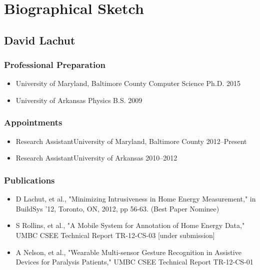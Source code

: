 \section{Biographical Sketch}
  \subsection{David Lachut}
    \subsubsection{Professional Preparation}
      \begin{itemize}
        \item University of Maryland, Baltimore County \hspace{20pt} Computer
	  Science \hfill Ph.D. 2015
	\item University of Arkansas \hspace{116pt} Physics \hfill B.S. 2009
      \end{itemize}
    \subsubsection{Appointments}
      \begin{itemize}
        \item Research Assistant\hfill University of Maryland, Baltimore County
2012--Present
        \item Research Assistant\hfill University of Arkansas \hspace{105pt}
2010--2012
      \end{itemize}

    \subsubsection{Publications}
      \begin{itemize}
	\item D Lachut, et al., "Minimizing Intrusiveness in Home Energy
	  Measurement," in BuildSys '12, Toronto, ON, 2012, pp 56-63. (Best
	  Paper Nominee)
        \item S Rollins, et al., "A Mobile System for Annotation of Home
	  Energy Data," UMBC CSEE Technical Report TR-12-CS-03 [under
	  submission]
        \item A Nelson, et al., "Wearable Multi-sensor Gesture Recognition in
	  Assistive Devices for Paralysis Patients," UMBC CSEE Technical Report
	  TR-12-CS-01
      \end{itemize}
